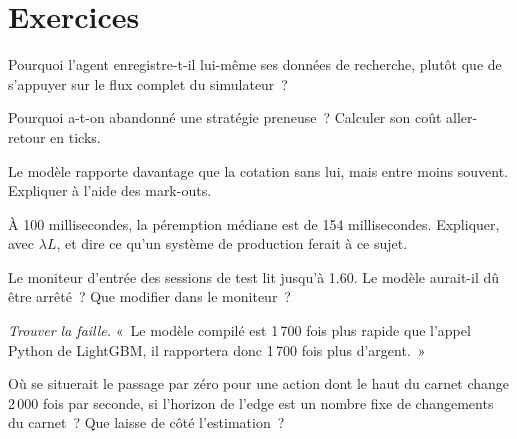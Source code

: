 \section{Exercices}

\begin{exercise}[$\star$]\label{exo:ml:build-an-order-book-model-end-to-end:1}
Pourquoi l'agent enregistre-t-il lui-même ses données de recherche, plutôt que de s'appuyer sur le flux complet du simulateur~?
\end{exercise}

\begin{exercise}[$\star$]\label{exo:ml:build-an-order-book-model-end-to-end:2}
Pourquoi a-t-on abandonné une stratégie preneuse~? Calculer son coût aller-retour en ticks.
\end{exercise}

\begin{exercise}[$\star$]\label{exo:ml:build-an-order-book-model-end-to-end:3}
Le modèle rapporte davantage que la cotation sans lui, mais entre moins souvent. Expliquer à l'aide des mark-outs.
\end{exercise}

\begin{exercise}[$\star\star$]\label{exo:ml:build-an-order-book-model-end-to-end:4}
À 100 millisecondes, la péremption médiane est de 154 millisecondes. Expliquer, avec $\lambda L$, et dire ce qu'un système de production ferait
à ce sujet.
\end{exercise}

\begin{exercise}[$\star\star$]\label{exo:ml:build-an-order-book-model-end-to-end:5}
Le moniteur d'entrée des sessions de test lit jusqu'à 1.60. Le modèle aurait-il dû être arrêté~? Que modifier dans le moniteur~?
\end{exercise}

\begin{exercise}[$\star\star$]\label{exo:ml:build-an-order-book-model-end-to-end:6}
\emph{Trouver la faille.} «~Le modèle compilé est 1\,700 fois plus rapide que l'appel Python de LightGBM, il rapportera donc 1\,700 fois plus
d'argent.~»
\end{exercise}

\begin{exercise}[$\star\star\star$]\label{exo:ml:build-an-order-book-model-end-to-end:7}
Où se situerait le passage par zéro pour une action dont le haut du carnet change 2\,000 fois par seconde, si l'horizon de l'edge est un nombre fixe
de changements du carnet~? Que laisse de côté l'estimation~?
\end{exercise}

